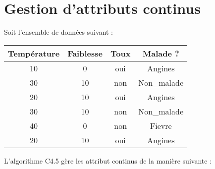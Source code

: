 \documentclass[a4paper, 11pt]{report}
\begin{document}
\section{Gestion d'attributs continus} 


Soit l'ensemble de données suivant :
\begin{center}
\begin{tabular}{| c | c | c | c |}
\hline
Température & Faiblesse & Toux & Malade ?\\
\hline
10 & 0 & oui & Angines\\
\hline
30 & 10 & non & Non\_malade\\
\hline
20 & 10 & oui & Angines\\
\hline

30 & 10 & non & Non\_malade\\
\hline

40 & 0 & non & Fievre\\
\hline

20 & 10 & oui & Angines\\
\hline
\end{tabular}
\end{center}
L'algorithme C4.5 gère les attribut continus de la manière suivante : 
\end{document}
